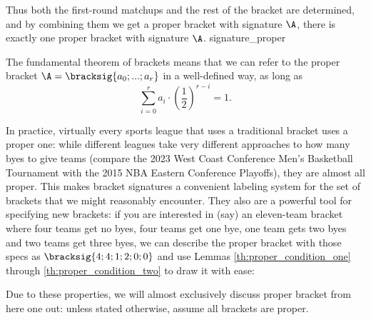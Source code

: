 {{    Thus both the first-round matchups and the rest of the bracket are determined, and by combining them we get a proper bracket with signature $\A$, there is exactly one proper bracket with signature $\A$.
}{signature_proper}

The fundamental theorem of brackets means that we can refer to the proper bracket $\A = \bracksig{a_0; ...; a_r}$ in a well-defined way, as long as $$\sum_{i=0}^r a_i \cdot \left(\frac{1}{2}\right)^{r - i} = 1.$$

In practice, virtually every sports league that uses a traditional bracket uses a proper one: while different leagues take very different approaches to how many byes to give teams (compare the 2023 West Coast Conference Men's Basketball Tournament with the 2015 NBA Eastern Conference Playoffs), they are almost all proper. This makes bracket signatures a convenient labeling system for the set of brackets that we might reasonably encounter. They also are a powerful tool for specifying new brackets: if you are interested in (say) an eleven-team bracket where four teams get no byes, four teams get one bye, one team gets two byes and two teams get three byes, we can describe the proper bracket with those specs as $\bracksig{4; 4; 1; 2; 0; 0}$ and use Lemmas \ref{th:proper_condition_one} through \ref{th:proper_condition_two} to draw it with ease:


Due to these properties, we will almost exclusively discuss proper bracket from here one out: unless stated otherwise, assume all brackets are proper.
}